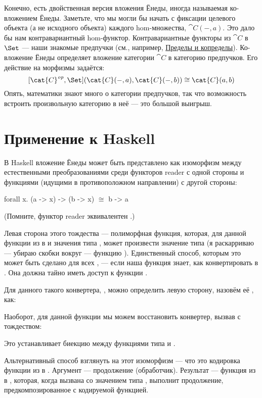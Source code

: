 Конечно, есть двойственная версия вложения Ёнеды, иногда
называемая ко-вложением Ёнеды. Заметьте, что мы могли бы начать с
фиксации целевого объекта (а не исходного объекта) каждого
hom-множества, $\cat{C}(-, a)$. Это дало бы нам контравариантный
hom-функтор. Контравариантные функторы из $\cat{C}$ в $\Set$ ---
наши знакомые предпучки (см., например,
\hyperref[limits-and-colimits]{Пределы
  и копределы}). Ко-вложение Ёнеды определяет вложение
категории $\cat{C}$ в категорию предпучков. Его действие на морфизмы
задаётся:
\[[\cat{C}^\mathit{op}, \Set](\cat{C}(-, a), \cat{C}(-, b)) \cong \cat{C}(a, b)\]
Опять, математики знают много о категории предпучков, так что
возможность встроить произвольную категорию в неё --- это большой выигрыш.

\section{Применение к Haskell}

В Haskell вложение Ёнеды может быть представлено как изоморфизм
между естественными преобразованиями среди функторов reader с одной стороны
и функциями (идущими в противоположном направлении) с другой стороны:

\begin{snipv}
forall x. (a -> x) -> (b -> x) \ensuremath{\cong} b -> a
\end{snipv}
(Помните, функтор reader эквивалентен
.)

Левая сторона этого тождества --- полиморфная функция, которая,
для данной функции из  в  и значения типа
, может произвести значение типа  (я раскарриваю ---
убираю скобки вокруг --- функцию
). Единственный способ, которым это может быть сделано для всех
, --- если наша функция знает, как конвертировать  в
. Она должна тайно иметь доступ к функции
.

Для данного такого конвертера, , можно определить левую сторону,
назовём её , как:

Наоборот, для данной функции  мы можем восстановить конвертер,
вызвав  с тождеством:

Это устанавливает биекцию между функциями типа
 и .

Альтернативный способ взглянуть на этот изоморфизм --- что это 
кодировка функции из  в . Аргумент
 --- продолжение (обработчик). Результат
--- функция из  в , которая, когда вызвана со
значением типа , выполнит продолжение, предкомпозированное с
кодируемой функцией.

